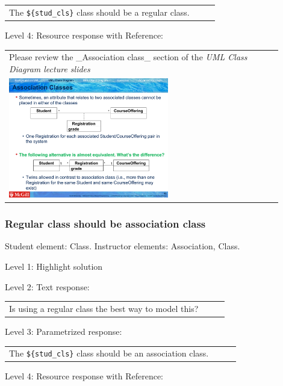 \begin{tabular}{|p{0.9\linewidth}}
The \verb|${stud_cls}| class should be a regular class.
\end{tabular} \medskip

\noindent Level 4: Resource response with Reference: \medskip

\begin{tabular}{|p{0.9\linewidth}}
Please review the _Association class_ section of the
\textit{UML Class Diagram lecture slides}

\\
\includegraphics[width=0.6\textwidth]{images/association_class.png}
\end{tabular} \medskip


\subsubsection{Regular class should be association class}

Student element: Class. Instructor elements: Association, Class. \medskip

\noindent Level 1: Highlight solution  \medskip

\noindent Level 2: Text response: \medskip

\begin{tabular}{|p{0.9\linewidth}}
Is using a regular class the best way to model this?
\end{tabular} \medskip

\noindent Level 3: Parametrized response: \medskip

\begin{tabular}{|p{0.9\linewidth}}
The \verb|${stud_cls}| class should be an association class.
\end{tabular} \medskip

\noindent Level 4: Resource response with Reference: \medskip

